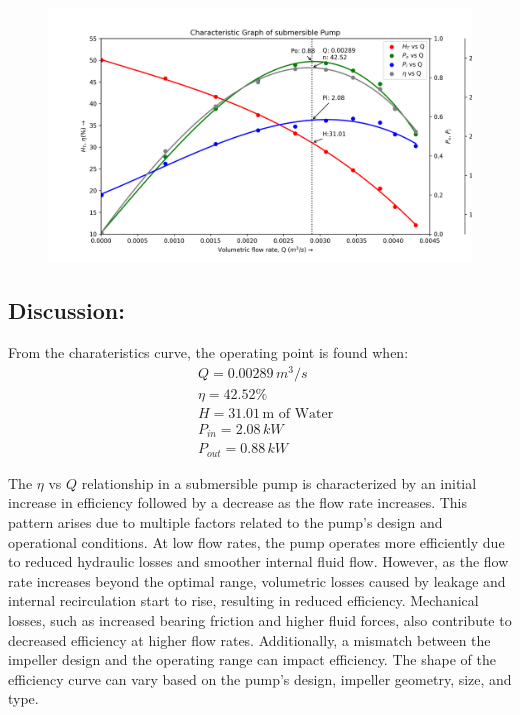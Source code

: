 \documentclass[12pt]{article}
\begin{document}
\pagebreak
\begin{figure}[h]
  \begin{center}
    \includegraphics*[width=0.89\linewidth]{img/exp_3a.png}
  \end{center}
\end{figure}

\pagebreak
\subsection*{Discussion:}
From the charateristics curve, the operating point is found when:
\begin{align*}
  & Q = 0.00289\, m^3/s \\
  &\eta = 42.52\% \\
  &H = 31.01\, \text{m of Water} \\
  &P_{in} = 2.08\, kW \\
  &P_{out} = 0.88\, kW
\end{align*}


The $\eta$ vs $Q$ relationship in a submersible pump is characterized by an initial increase in efficiency followed by a decrease as the flow rate increases. This pattern arises due to multiple factors related to the pump's design and operational conditions. At low flow rates, the pump operates more efficiently due to reduced hydraulic losses and smoother internal fluid flow. However, as the flow rate increases beyond the optimal range, volumetric losses caused by leakage and internal recirculation start to rise, resulting in reduced efficiency. Mechanical losses, such as increased bearing friction and higher fluid forces, also contribute to decreased efficiency at higher flow rates. Additionally, a mismatch between the impeller design and the operating range can impact efficiency. The shape of the efficiency curve can vary based on the pump's design, impeller geometry, size, and type. \\
\end{document}
